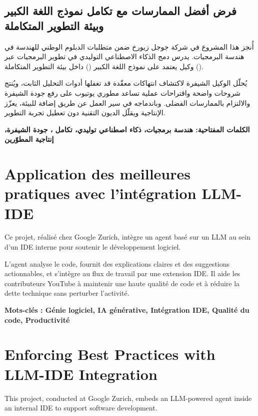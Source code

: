 \thispagestyle{empty}
\begingroup
\singlespacing
\small
\setlength{\parskip}{3pt}
\setlength{\parindent}{0pt}
\enlargethispage{2\baselineskip}

\begin{otherlanguage}{arabic}
\section*{فرض أفضل الممارسات مع تكامل نموذج اللغة الكبير وبيئة التطوير المتكاملة}
أُنجز هذا المشروع في شركة جوجل زيورخ ضمن متطلبات الدبلوم الوطني للهندسة في هندسة البرمجيات. يدرس دمج الذكاء الاصطناعي التوليدي في تطوير البرمجيات عبر وكيل يعتمد على نموذج اللغة الكبير () داخل بيئة التطوير المتكاملة ().

يُحلّل الوكيل الشيفرة لاكتشاف انتهاكات معقّدة قد تغفلها أدوات التحليل الثابت، ويُنتج شروحات واضحة واقتراحات عملية تساعد مطوري يوتيوب على رفع جودة الشيفرة والالتزام بالممارسات الفضلى. وباندماجه في سير العمل عن طريق إضافة للبيئة، يعزّز الإنتاجية ويقلّل الديون التقنية دون تعطيل تجربة التطوير.

\textbf{الكلمات المفتاحية: هندسة برمجيات، ذكاء اصطناعي توليدي، تكامل ، جودة الشيفرة، إنتاجية المطوّرين}
\end{otherlanguage}

\vspace{0.5cm}

\section*{Application des meilleures pratiques avec l'intégration LLM-IDE}
Ce projet, réalisé chez Google Zurich, intègre un agent basé sur un LLM au sein d'un IDE interne pour soutenir le développement logiciel.

L'agent analyse le code, fournit des explications claires et des suggestions actionnables, et s'intègre au flux de travail par une extension IDE. Il aide les contributeurs YouTube à maintenir une haute qualité de code et à réduire la dette technique sans perturber l'activité.

\textbf{Mots-clés : Génie logiciel, IA générative, Intégration IDE, Qualité du code, Productivité}

\vspace{0.5cm}

\section*{Enforcing Best Practices with LLM-IDE Integration}
This project, conducted at Google Zurich, embeds an LLM-powered agent inside an internal IDE to support software development.


